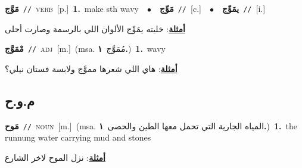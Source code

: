 \documentclass[10pt,a4paper,twoside]{article} %
\begin{document}
\begin{multicols}{2}
{\setlength\topsep{0pt}\textbf{\foreignlanguage{arabic}{مَوَّج}}\ {\color{gray}\texttt{//}\color{black}}\ \textsc{verb}\ [p.]\ \textbf{1.}~make sth wavy\ \ $\bullet$\ \ \setlength\topsep{0pt}\textbf{\foreignlanguage{arabic}{مَوِّج}}\ {\color{gray}\texttt{//}\color{black}}\ [c.]\ \ $\bullet$\ \ \setlength\topsep{0pt}\textbf{\foreignlanguage{arabic}{يمَوِّج}}\ {\color{gray}\texttt{//}\color{black}}\ [i.]\  \begin{flushright}\color{gray}\foreignlanguage{arabic}{\textbf{\underline{\foreignlanguage{arabic}{أمثلة}}}: خليته يمَوِّج الألوان اللي بالرسمة وصارت أحلى}\end{flushright}\color{black}} \vspace{2mm}

{\setlength\topsep{0pt}\textbf{\foreignlanguage{arabic}{مْمَوَّج}}\ {\color{gray}\texttt{//}\color{black}}\ \textsc{adj}\ [m.]\ \color{gray}(msa. \foreignlanguage{arabic}{مُمَوَّج}~\foreignlanguage{arabic}{\textbf{١.}})\color{black}\ \textbf{1.}~wavy\  \begin{flushright}\color{gray}\foreignlanguage{arabic}{\textbf{\underline{\foreignlanguage{arabic}{أمثلة}}}: هاي اللي شعرها مموَّج ولابسة فستان نيلي؟}\end{flushright}\color{black}} \vspace{2mm}

\vspace{-3mm}
\subsection*{\color{blue}\foreignlanguage{arabic}{م.و.ح}\color{blue}{}} 

{\setlength\topsep{0pt}\textbf{\foreignlanguage{arabic}{مَوح}}\ {\color{gray}\texttt{//}\color{black}}\ \textsc{noun}\ [m.]\ \color{gray}(msa. \foreignlanguage{arabic}{المياه الجارية التي تحمل معها الطين والحصى}~\foreignlanguage{arabic}{\textbf{١.}})\color{black}\ \textbf{1.}~the runnung water carrying mud and stones\  \begin{flushright}\color{gray}\foreignlanguage{arabic}{\textbf{\underline{\foreignlanguage{arabic}{أمثلة}}}: نزل الموح  لاخر الشارع}\end{flushright}\color{black}} \vspace{2mm}


\end{multicols}
\end{document}
